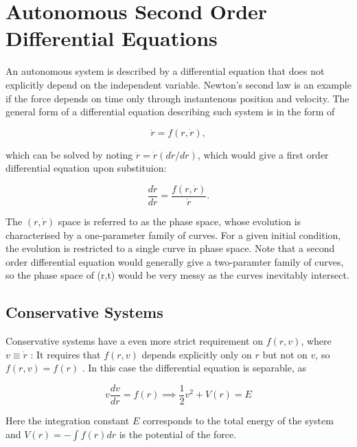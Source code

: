 \documentclass[english,a4paper,12pt]{report}
\begin{document}







\chapter{Autonomous Second Order Differential Equations}

An autonomous system is described by a differential equation that does not explicitly depend on the independent variable. Newton's second law is an example if the force depends on time only through instantenous position and velocity. The general form of a differential equation describing such system is in the form of 

\begin{equation}
    \ddot{r} = f(r,\dot{r} ),
\end{equation}

which can be solved by noting \(\ddot{r} = \dot{r} ( d \dot{r} /dr )  \), which would give a first order differential equation upon substituion:

\begin{equation}
    \frac{d \dot{r} }{dr} = \frac{f(r,\dot{r} )}{\dot{r} } .
\end{equation}

The \((r,\dot{r} )\) space is referred to as the phase space, whose evolution is characterised by a one-parameter family of curves. For a given initial condition, the evolution is restricted to a single curve in phase space. Note that a second order differential equation would generally give a two-paramter family of curves, so the phase space of (r,t) would be very messy as the curves inevitably intersect.

\section{Conservative Systems}

Conservative systems have a even more strict requirement on \(f(r,v)\), where \(v \equiv \dot{r} \) : It requires that \(f(r,v)\) depends explicitly only on \(r\) but not on \(v\), so \(f(r,v) = f(r)\) . In this case the differential equation is separable, as

\begin{equation}
    v\frac{dv}{dr} = f(r) \implies \frac{1}{2} v^2+ V(r) = E
\end{equation}

Here the integration constant \(E\) corresponds to the total energy of the system and \(V(r) = - \int f(r)dr\) is the potential of the force. 
\end{document}
